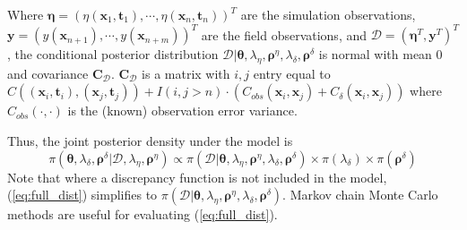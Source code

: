 \documentclass{article}
\begin{document}
Where $\boldsymbol \eta = (\eta(\mathbf x_1,\mathbf t_1),\cdots,\eta(\mathbf x_n,\mathbf t_n))^T$ are the simulation observations, $\mathbf y = (y(\mathbf x_{n+1}),\cdots,y(\mathbf x_{n+m}))^T$
are the field observations, and $\mathcal D = (\boldsymbol \eta^T,\mathbf y^T)^T$, the conditional posterior distribution $\mathcal D | \boldsymbol \theta,\lambda_\eta, \boldsymbol \rho^\eta,\lambda_\delta,\boldsymbol \rho^\delta$ is normal with mean 0 and covariance $\mathbf C_\mathcal D$. 
%
$\mathbf C_\mathcal D$ is a matrix with $i,j$ entry equal to 
$
C((\mathbf x_i,\mathbf t_i),(\mathbf x_j,\mathbf t_j)) + I(i,j>n)\cdot(C_{obs}(\mathbf x_i,\mathbf x_j) + C_\delta(\mathbf x_i,\mathbf x_j))
$
where $C_{obs}(\cdot,\cdot)$ is the (known) observation error variance.
%


Thus, the joint posterior density under the model is
%
\begin{equation} \label{eq:full_dist}
\pi(\boldsymbol \theta,\lambda_\delta,\boldsymbol \rho^\delta|\mathcal D,\lambda_\eta,\boldsymbol \rho^\eta)
\propto \pi(\mathcal D | \boldsymbol \theta,\lambda_\eta, \boldsymbol \rho^\eta,\lambda_\delta,\boldsymbol \rho^\delta) \times %
\pi(\lambda_\delta) \times \pi(\boldsymbol \rho^\delta)
\end{equation}
%
Note that where a discrepancy function is not included in the model, 
(\ref{eq:full_dist}) simplifies to 
%
$\pi(\mathcal D | \boldsymbol \theta,\lambda_\eta, \boldsymbol \rho^\eta,\lambda_\delta,\boldsymbol \rho^\delta)$. 
%
Markov chain Monte Carlo methods are useful for evaluating (\ref{eq:full_dist}).
\end{document}
